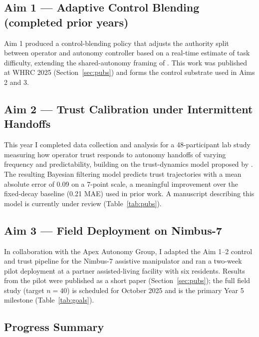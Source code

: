 \subsection{Aim 1 --- Adaptive Control Blending (completed prior years)}

Aim 1 produced a control-blending policy that adjusts the authority split between operator and
autonomy controller based on a real-time estimate of task difficulty, extending the
shared-autonomy framing of \citet{chen2021shared}. This work was published at WHRC 2025
(Section~\ref{sec:pubs}) and forms the control substrate used in Aims 2 and 3.

\subsection{Aim 2 --- Trust Calibration under Intermittent Handoffs}

This year I completed data collection and analysis for a 48-participant lab study measuring how
operator trust responds to autonomy handoffs of varying frequency and predictability, building
on the trust-dynamics model proposed by \citet{okafor2022trust}. The resulting Bayesian
filtering model predicts trust trajectories with a mean absolute error of 0.09 on a 7-point
scale, a meaningful improvement over the fixed-decay baseline (0.21 MAE) used in prior work. A
manuscript describing this model is currently under review (Table~\ref{tab:pubs}).

\subsection{Aim 3 --- Field Deployment on Nimbus-7}

In collaboration with the Apex Autonomy Group, I adapted the Aim 1--2 control and trust
pipeline for the Nimbus-7 assistive manipulator and ran a two-week pilot deployment at a
partner assisted-living facility with six residents. Results from the pilot were published as a
short paper (Section~\ref{sec:pubs}); the full field study (target $n=40$) is scheduled for
October 2025 and is the primary Year 5 milestone (Table~\ref{tab:goals}).

\subsection{Progress Summary}

